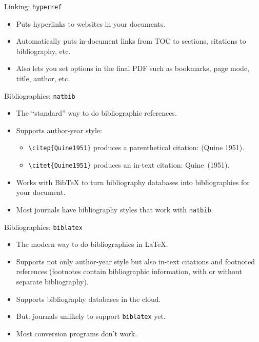 \begin{frame}{Linking: \texttt{hyperref}}

\begin{itemize}
\item Puts hyperlinks to websites in your documents.
\item Automatically puts in-document links from TOC to sections,
  citations to bibliography, etc.
\item Also lets you set options in the final PDF such as bookmarks,
  page mode, title, author, etc.
\end{itemize}

\end{frame}

\begin{frame}[fragile]{Bibliographies: \texttt{natbib}}

\begin{itemize}
\item The ``standard'' way to do bibliographic references.
\item Supports author-year style:
\begin{itemize}
\item \verb+\citep{Quine1951}+ produces a parenthetical citation: (Quine 1951).
\item \verb+\citet{Quine1951}+ produces an in-text citation: Quine~(1951).
\end{itemize}
\item Works with Bib\TeX{} to turn bibliography databases into
  bibliographies for your document.
\item Most journals have bibliography styles that work with \texttt{natbib}.
\end{itemize}

\end{frame}

\begin{frame}{Bibliographies: \texttt{biblatex}}

\begin{itemize}
\item The modern way to do bibliographies in \LaTeX.
\item Supports not only author-year style but also in-text citations
  and footnoted references (footnotes contain bibliographic
  information, with or without separate bibliography).
\item Supports bibliography databases in the cloud.
\item But: journals unlikely to support \texttt{biblatex} yet.
\item Most conversion programs don't work.
\end{itemize}

\end{frame}

